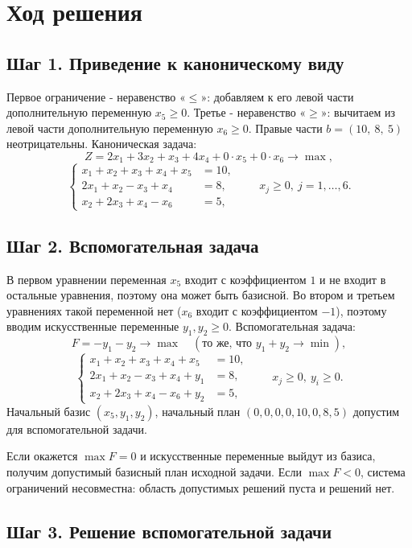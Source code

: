 \documentclass[a4paper,12pt]{article}
\begin{document}
\section{Ход решения}

\subsection*{Шаг 1. Приведение к каноническому виду}

Первое ограничение - неравенство «$\le$»: добавляем к его левой части дополнительную переменную $x_5 \ge 0$. Третье - неравенство «$\ge$»: вычитаем из левой части дополнительную переменную $x_6 \ge 0$. Правые части $b = (10,\ 8,\ 5)$ неотрицательны. Каноническая задача:
\[
Z = 2x_1 + 3x_2 + x_3 + 4x_4 + 0\cdot x_5 + 0\cdot x_6 \to \max,
\]
\[
\left\{
\begin{aligned}
x_1 + x_2 + x_3 + x_4 + x_5 &= 10,\\
2x_1 + x_2 - x_3 + x_4 &= 8,\\
x_2 + 2x_3 + x_4 - x_6 &= 5,
\end{aligned}
\right.
\qquad x_j \ge 0,\ j = 1,\dots,6.
\]

\subsection*{Шаг 2. Вспомогательная задача}

В первом уравнении переменная $x_5$ входит с коэффициентом $1$ и не входит в остальные уравнения, поэтому она может быть базисной. Во втором и третьем уравнениях такой переменной нет ($x_6$ входит с коэффициентом $-1$), поэтому вводим искусственные переменные $y_1, y_2 \ge 0$. Вспомогательная задача:
\[
F = -y_1 - y_2 \to \max \quad(\text{то же, что } y_1 + y_2 \to \min),
\]
\[
\left\{
\begin{aligned}
x_1 + x_2 + x_3 + x_4 + x_5 &= 10,\\
2x_1 + x_2 - x_3 + x_4 + y_1 &= 8,\\
x_2 + 2x_3 + x_4 - x_6 + y_2 &= 5,
\end{aligned}
\right.
\qquad x_j \ge 0,\ y_i \ge 0.
\]
Начальный базис $(x_5, y_1, y_2)$, начальный план $(0,0,0,0,10,0,8,5)$ допустим для вспомогательной задачи.

Если окажется $\max F = 0$ и искусственные переменные выйдут из базиса, получим допустимый базисный план исходной задачи. Если $\max F < 0$, система ограничений несовместна: область допустимых решений пуста и решений нет.

\subsection*{Шаг 3. Решение вспомогательной задачи}
\end{document}
